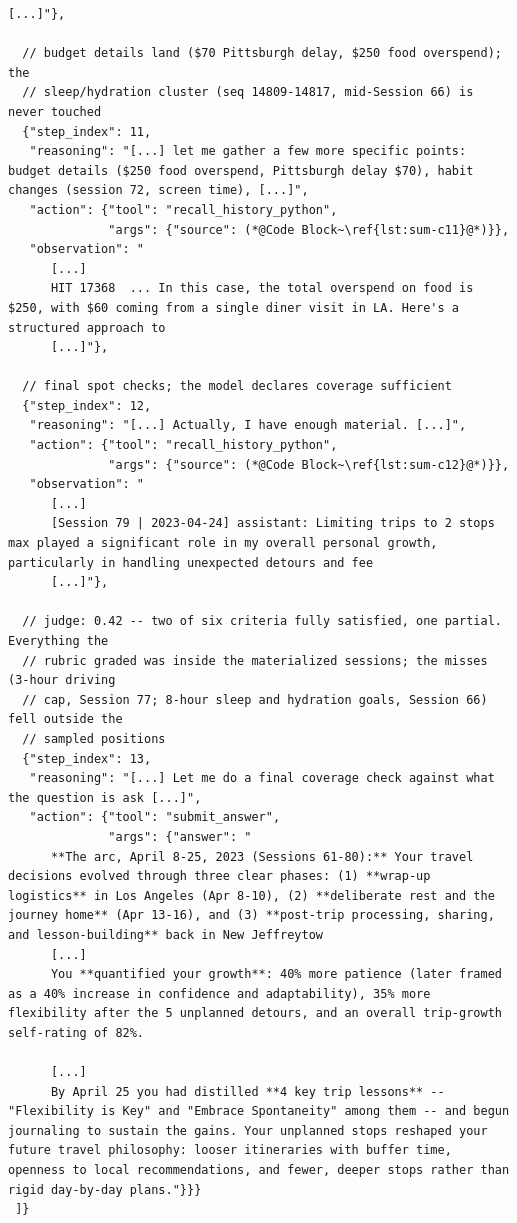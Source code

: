 \begin{lstlisting}[style=traj]
      [...]"},

  // budget details land ($70 Pittsburgh delay, $250 food overspend); the 
  // sleep/hydration cluster (seq 14809-14817, mid-Session 66) is never touched
  {"step_index": 11,
   "reasoning": "[...] let me gather a few more specific points: budget details ($250 food overspend, Pittsburgh delay $70), habit changes (session 72, screen time), [...]",
   "action": {"tool": "recall_history_python",
              "args": {"source": (*@Code Block~\ref{lst:sum-c11}@*)}},
   "observation": "
      [...]
      HIT 17368  ... In this case, the total overspend on food is $250, with $60 coming from a single diner visit in LA. Here's a structured approach to
      [...]"},

  // final spot checks; the model declares coverage sufficient
  {"step_index": 12,
   "reasoning": "[...] Actually, I have enough material. [...]",
   "action": {"tool": "recall_history_python",
              "args": {"source": (*@Code Block~\ref{lst:sum-c12}@*)}},
   "observation": "
      [...]
      [Session 79 | 2023-04-24] assistant: Limiting trips to 2 stops max played a significant role in my overall personal growth, particularly in handling unexpected detours and fee
      [...]"},

  // judge: 0.42 -- two of six criteria fully satisfied, one partial. Everything the
  // rubric graded was inside the materialized sessions; the misses (3-hour driving 
  // cap, Session 77; 8-hour sleep and hydration goals, Session 66) fell outside the 
  // sampled positions
  {"step_index": 13,
   "reasoning": "[...] Let me do a final coverage check against what the question is ask [...]",
   "action": {"tool": "submit_answer",
              "args": {"answer": "
      **The arc, April 8-25, 2023 (Sessions 61-80):** Your travel decisions evolved through three clear phases: (1) **wrap-up logistics** in Los Angeles (Apr 8-10), (2) **deliberate rest and the journey home** (Apr 13-16), and (3) **post-trip processing, sharing, and lesson-building** back in New Jeffreytow
      [...]
      You **quantified your growth**: 40% more patience (later framed as a 40% increase in confidence and adaptability), 35% more flexibility after the 5 unplanned detours, and an overall trip-growth self-rating of 82%.

      [...]
      By April 25 you had distilled **4 key trip lessons** -- "Flexibility is Key" and "Embrace Spontaneity" among them -- and begun journaling to sustain the gains. Your unplanned stops reshaped your future travel philosophy: looser itineraries with buffer time, openness to local recommendations, and fewer, deeper stops rather than rigid day-by-day plans."}}}
 ]}
\end{lstlisting}

